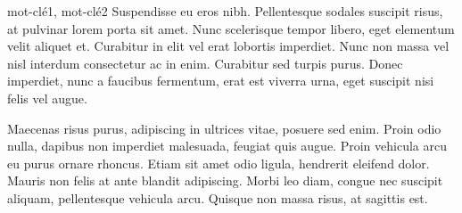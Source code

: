 \documentclass[letterpaper, twoside, 12pt,these,creativecommons,hyperref]{thETS}
\begin{document}
\begin{sommaire}{mot-clé1, mot-clé2}
Suspendisse eu eros nibh. Pellentesque sodales suscipit risus, at pulvinar lorem porta sit amet. Nunc scelerisque tempor libero, eget elementum velit aliquet et. Curabitur in elit vel erat lobortis imperdiet. Nunc non massa vel nisl interdum consectetur ac in enim. Curabitur sed turpis purus. Donec imperdiet, nunc a faucibus fermentum, erat est viverra urna, eget suscipit nisi felis vel augue.

Maecenas risus purus, adipiscing in ultrices vitae, posuere sed enim. Proin odio nulla, dapibus non imperdiet malesuada, feugiat quis augue. Proin vehicula arcu eu purus ornare rhoncus. Etiam sit amet odio ligula, hendrerit eleifend dolor. Mauris non felis at ante blandit adipiscing. Morbi leo diam, congue nec suscipit aliquam, pellentesque vehicula arcu. Quisque non massa risus, at sagittis est.


\end{sommaire}
\end{document}
